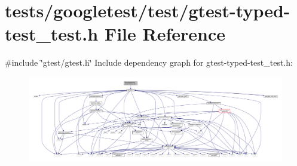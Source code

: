 \hypertarget{gtest-typed-test__test_8h}{}\section{tests/googletest/test/gtest-\/typed-\/test\+\_\+test.h File Reference}
\label{gtest-typed-test__test_8h}
{\ttfamily \#include \char`\"{}gtest/gtest.\+h\char`\"{}}\newline
Include dependency graph for gtest-\/typed-\/test\+\_\+test.h\+:\nopagebreak
\begin{figure}[H]
\begin{center}
\leavevmode
\includegraphics[width=350pt]{gtest-typed-test__test_8h__incl}
\end{center}
\end{figure}
